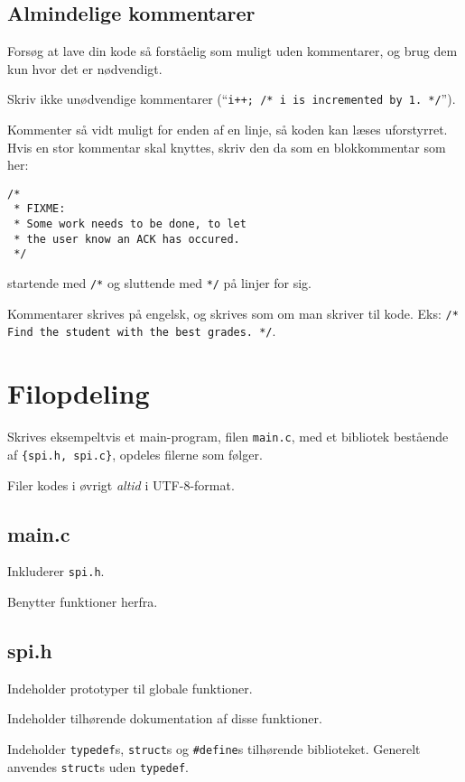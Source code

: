 \documentclass[article, 10pt]{memoir}
\let\tempone\itemize
\let\temptwo\enditemize
\renewenvironment{itemize}{\tempone\firmlist}{\temptwo}
\begin{document}
\begin{multicols}{2}
    \section{Almindelige kommentarer}
    \begin{itemize}
    \item Forsøg at lave din kode så forståelig som muligt uden kommentarer, og brug dem kun hvor det er nødvendigt.
    \item Skriv ikke unødvendige kommentarer (``\texttt{i++; /* i is incremented by 1. */}'').
    \item Kommenter så vidt muligt for enden af en linje, så koden kan læses uforstyrret. Hvis en stor kommentar skal knyttes, skriv den da som en blokkommentar som her:
        \begin{lstlisting}
/* 
 * FIXME:
 * Some work needs to be done, to let
 * the user know an ACK has occured. 
 */
        \end{lstlisting}
        startende med \texttt{/*} og sluttende med \texttt{*/} på linjer for sig.
    \item Kommentarer skrives på engelsk, og skrives som om man skriver til kode. Eks: \texttt{/* Find the student with the best grades. */}.
    \end{itemize}

    \chapter{Filopdeling}
    Skrives eksempeltvis et main-program, filen \texttt{main.c}, med et bibliotek bestående af \texttt{\{spi.h, spi.c\}}, opdeles filerne som følger. 

    Filer kodes i øvrigt \emph{altid} i UTF-8-format.

    \section{main.c}
    \begin{itemize}
    \item Inkluderer \texttt{spi.h}.
    \item Benytter funktioner herfra.
    \end{itemize}

    \section{spi.h}
    \begin{itemize}
    \item Indeholder prototyper til globale funktioner.
    \item Indeholder tilhørende dokumentation af disse funktioner.
    \item Indeholder \texttt{typedef}s, \texttt{struct}s og \texttt{\#define}s tilhørende biblioteket. Generelt anvendes \texttt{struct}s uden \texttt{typedef}.
    \end{itemize}


\end{multicols}
\end{document}
